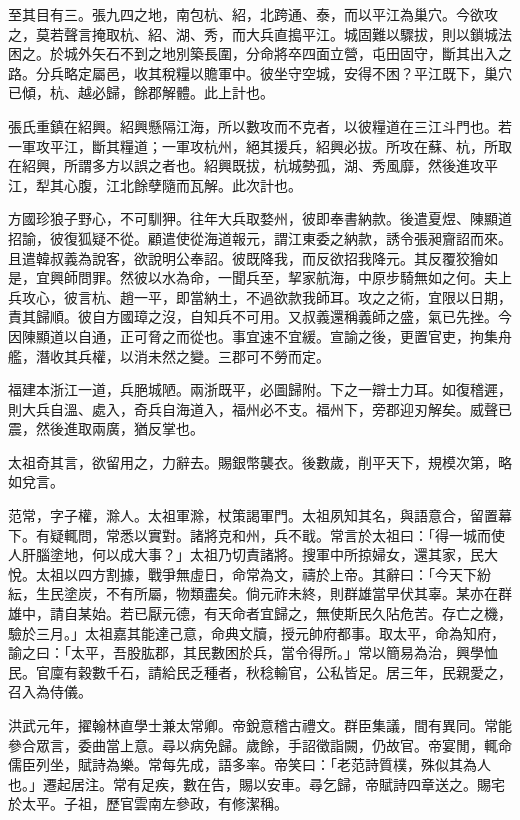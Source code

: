 \begin{pinyinscope}
至其目有三。張九四之地，南包杭、紹，北跨通、泰，而以平江為巢穴。今欲攻之，莫若聲言掩取杭、紹、湖、秀，而大兵直搗平江。城固難以驟拔，則以鎖城法困之。於城外矢石不到之地別築長圍，分命將卒四面立營，屯田固守，斷其出入之路。分兵略定屬邑，收其稅糧以贍軍中。彼坐守空城，安得不困？平江既下，巢穴已傾，杭、越必歸，餘郡解體。此上計也。

張氏重鎮在紹興。紹興懸隔江海，所以數攻而不克者，以彼糧道在三江斗門也。若一軍攻平江，斷其糧道；一軍攻杭州，絕其援兵，紹興必拔。所攻在蘇、杭，所取在紹興，所謂多方以誤之者也。紹興既拔，杭城勢孤，湖、秀風靡，然後進攻平江，犁其心腹，江北餘孽隨而瓦解。此次計也。

方國珍狼子野心，不可馴狎。往年大兵取婺州，彼即奉書納款。後遣夏煜、陳顯道招諭，彼復狐疑不從。顧遣使從海道報元，謂江東委之納款，誘令張昶齎詔而來。且遣韓叔義為說客，欲說明公奉詔。彼既降我，而反欲招我降元。其反覆狡獪如是，宜興師問罪。然彼以水為命，一聞兵至，挈家航海，中原步騎無如之何。夫上兵攻心，彼言杭、趙一平，即當納土，不過欲款我師耳。攻之之術，宜限以日期，責其歸順。彼自方國璋之沒，自知兵不可用。又叔義還稱義師之盛，氣已先挫。今因陳顯道以自通，正可脅之而從也。事宜速不宜緩。宣諭之後，更置官吏，拘集舟艦，潛收其兵權，以消未然之變。三郡可不勞而定。

福建本浙江一道，兵脃城陋。兩浙既平，必圖歸附。下之一辯士力耳。如復稽遲，則大兵自溫、處入，奇兵自海道入，福州必不支。福州下，旁郡迎刃解矣。威聲已震，然後進取兩廣，猶反掌也。

太祖奇其言，欲留用之，力辭去。賜銀幣襲衣。後數歲，削平天下，規模次第，略如兌言。

范常，字子權，滁人。太祖軍滁，杖策謁軍門。太祖夙知其名，與語意合，留置幕下。有疑輒問，常悉以實對。諸將克和州，兵不戢。常言於太祖曰：「得一城而使人肝腦塗地，何以成大事？」太祖乃切責諸將。搜軍中所掠婦女，還其家，民大悅。太祖以四方割據，戰爭無虛日，命常為文，禱於上帝。其辭曰：「今天下紛紜，生民塗炭，不有所屬，物類盡矣。倘元祚未終，則群雄當早伏其辜。某亦在群雄中，請自某始。若已厭元德，有天命者宜歸之，無使斯民久阽危苦。存亡之機，驗於三月。」太祖嘉其能達己意，命典文牘，授元帥府都事。取太平，命為知府，諭之曰：「太平，吾股肱郡，其民數困於兵，當令得所。」常以簡易為治，興學恤民。官廩有穀數千石，請給民乏種者，秋稔輸官，公私皆足。居三年，民親愛之，召入為侍儀。

洪武元年，擢翰林直學士兼太常卿。帝銳意稽古禮文。群臣集議，間有異同。常能參合眾言，委曲當上意。尋以病免歸。歲餘，手詔徵詣闕，仍故官。帝宴閒，輒命儒臣列坐，賦詩為樂。常每先成，語多率。帝笑曰：「老范詩質樸，殊似其為人也。」遷起居注。常有足疾，數在告，賜以安車。尋乞歸，帝賦詩四章送之。賜宅於太平。子祖，歷官雲南左參政，有修潔稱。


\end{pinyinscope}
